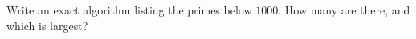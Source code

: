 Write an exact algorithm listing the primes below $1000$. How many are there, and which is largest?
